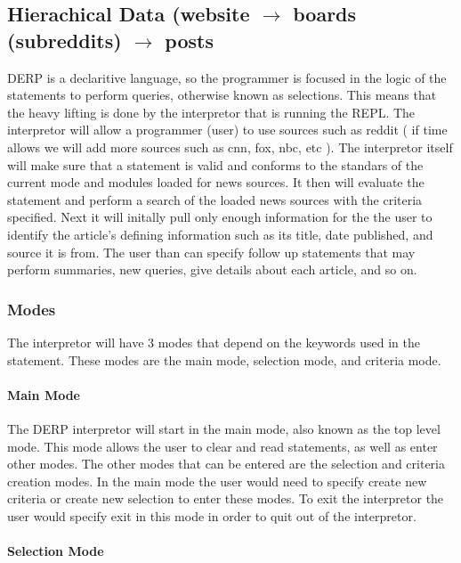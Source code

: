 \subsection{Hierachical Data (website $\rightarrow$ boards (subreddits) $\rightarrow$ posts}
DERP is a declaritive language, so the programmer is focused in the logic of the statements to perform queries, otherwise known as selections. This means that the heavy lifting is done by the interpretor that is running the REPL. The interpretor will allow a programmer (user) to use sources such as reddit ( if time allows we will add more sources such as cnn, fox, nbc, etc ). The interpretor itself will make sure that a statement is valid and conforms to the standars of the current mode and modules loaded for news sources. It then will evaluate the statement and perform a search of the loaded news sources with the criteria specified. Next it will initally pull only enough information for the the user to identify the article's defining information such as its title, date published, and source it is from. The user than can specify follow up statements that may perform summaries, new queries, give details about each article, and so on. \\


\subsubsection{Modes}
The interpretor will have 3 modes that depend on the keywords used in the statement. These modes are the main mode, selection mode, and criteria mode.

\paragraph{Main Mode}

The DERP interpretor will start in the main mode, also known as the top level mode. This mode allows the user to clear and read statements, as well as enter other modes. The other modes that can be entered are the selection and criteria creation modes. In the main mode the user would need to specify create new criteria or create new selection to enter these modes. To exit the interpretor the user would specify exit in this mode in order to quit out of the interpretor.

\paragraph{Selection Mode}

